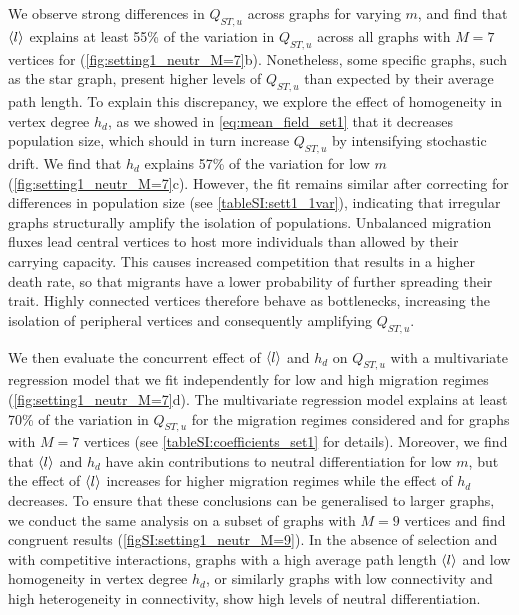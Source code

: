 We observe strong differences in $Q_{ST,u}$ across graphs for varying $m$, and find that $\langle l \rangle$ explains at least 55\% of the variation in $Q_{ST,u}$ across all graphs with $M=7$ vertices for (\cref{fig:setting1_neutr_M=7}b). Nonetheless, some specific graphs, such as the star graph, present higher levels of $Q_{ST,u}$ than expected by their average path length. To explain this discrepancy, we explore the effect of homogeneity in vertex degree $h_d$, as we showed in \cref{eq:mean_field_set1} that it decreases population size, which should in turn increase $Q_{ST,u}$ by intensifying stochastic drift.
%
We find that $h_d$ explains 57\% of the variation for low $m$ (\cref{fig:setting1_neutr_M=7}c). However, the fit remains similar after correcting for differences in population size (see \cref{tableSI:sett1_1var}), indicating that irregular graphs structurally amplify the isolation of populations. Unbalanced migration fluxes lead central vertices to host more individuals than allowed by their carrying capacity. This causes increased competition that results in a higher death rate, so that migrants have a lower probability of further spreading their trait. Highly connected vertices therefore behave as bottlenecks, increasing the isolation of peripheral vertices and consequently amplifying $Q_{ST,u}$.

We then evaluate the concurrent effect of $\langle l \rangle$ and $h_d$ on $Q_{ST,u}$ with a multivariate regression model that we fit independently for low and high migration regimes (\cref{fig:setting1_neutr_M=7}d).
%
The multivariate regression model explains at least 70\% of the variation in $Q_{ST,u}$ for the migration regimes considered and for graphs with $M=7$ vertices (see \cref{tableSI:coefficients_set1} for details). Moreover, we find that $\langle l \rangle$ and $h_d$ have akin contributions to neutral differentiation for low $m$, but the effect of $\langle l \rangle$ increases for higher migration regimes while the effect of $h_d$ decreases.
%
To ensure that these conclusions can be generalised to larger graphs, we conduct the same analysis on a subset of graphs with $M=9$ vertices and find congruent results (\cref{figSI:setting1_neutr_M=9}).
%
In the absence of selection and with competitive interactions, graphs with a high average path length $\langle l \rangle$ and low homogeneity in vertex degree $h_d$, or similarly graphs with low connectivity and high heterogeneity in connectivity, show high levels of neutral differentiation.

